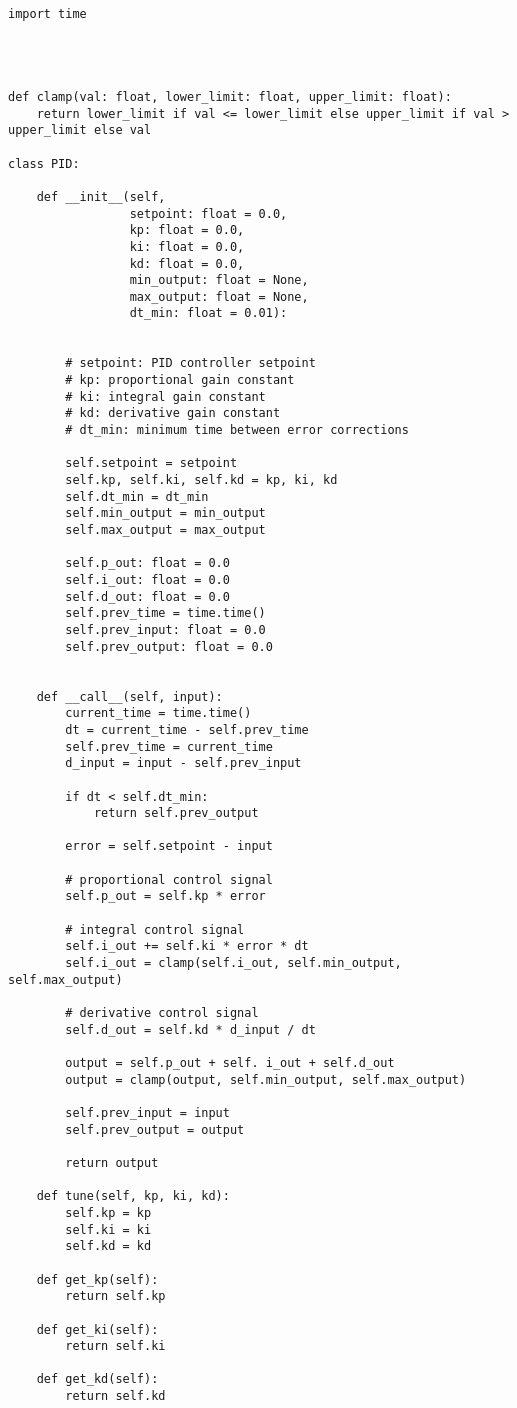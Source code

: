 \begin{lstlisting}[language=PythonPlus, basicstyle=\tiny,]

import time




def clamp(val: float, lower_limit: float, upper_limit: float):
    return lower_limit if val <= lower_limit else upper_limit if val > upper_limit else val

class PID:

    def __init__(self,
                 setpoint: float = 0.0,
                 kp: float = 0.0,
                 ki: float = 0.0,
                 kd: float = 0.0,
                 min_output: float = None,
                 max_output: float = None,
                 dt_min: float = 0.01):
        

        # setpoint: PID controller setpoint
        # kp: proportional gain constant
        # ki: integral gain constant
        # kd: derivative gain constant
        # dt_min: minimum time between error corrections

        self.setpoint = setpoint
        self.kp, self.ki, self.kd = kp, ki, kd
        self.dt_min = dt_min
        self.min_output = min_output
        self.max_output = max_output
        
        self.p_out: float = 0.0
        self.i_out: float = 0.0
        self.d_out: float = 0.0
        self.prev_time = time.time()
        self.prev_input: float = 0.0
        self.prev_output: float = 0.0


    def __call__(self, input):
        current_time = time.time()
        dt = current_time - self.prev_time
        self.prev_time = current_time
        d_input = input - self.prev_input

        if dt < self.dt_min:
            return self.prev_output
        
        error = self.setpoint - input

        # proportional control signal
        self.p_out = self.kp * error

        # integral control signal
        self.i_out += self.ki * error * dt
        self.i_out = clamp(self.i_out, self.min_output, self.max_output)

        # derivative control signal
        self.d_out = self.kd * d_input / dt

        output = self.p_out + self. i_out + self.d_out
        output = clamp(output, self.min_output, self.max_output)

        self.prev_input = input
        self.prev_output = output

        return output
    
    def tune(self, kp, ki, kd):
        self.kp = kp
        self.ki = ki
        self.kd = kd

    def get_kp(self):
        return self.kp
    
    def get_ki(self):
        return self.ki
    
    def get_kd(self):
        return self.kd


\end{lstlisting}

